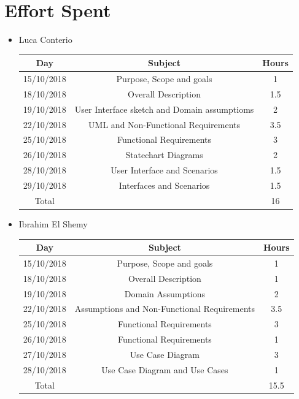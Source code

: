 \documentclass[12pt,a4paper]{article}
\begin{document}
	\section{Effort Spent}
	\begin{itemize}
		\item Luca Conterio
		\begin{center}
			\begin{tabular}{| c | c | c |}
				\hline
				Day & Subject & Hours \\ \hline
				15/10/2018 & Purpose, Scope and goals & 1 \\
				18/10/2018 & Overall Description & 1.5 \\
				19/10/2018  & User Interface sketch and Domain assumptioms & 2 \\
				22/10/2018  & UML and Non-Functional Requirements & 3.5 \\
				25/10/2018 & Functional Requirements & 3 \\
				26/10/2018 & Statechart Diagrams & 2 \\
				28/10/2018 & User Interface and Scenarios & 1.5 \\
				29/10/2018 & Interfaces and Scenarios & 1.5 \\
				\hline
				Total & & 16 \\
				\hline
			\end{tabular}
		\end{center}
		
		\item Ibrahim El Shemy
		\begin{center}
			\begin{tabular}{| c | c | c |}
				\hline
				Day & Subject & Hours \\ \hline
				15/10/2018 & Purpose, Scope and goals & 1 \\
				18/10/2018 & Overall Description & 1 \\
				19/10/2018  & Domain Assumptions & 2 \\
				22/10/2018  & Assumptions and Non-Functional Requirements & 3.5 \\
				25/10/2018 & Functional Requirements & 3 \\
				26/10/2018 & Functional Requirements & 1 \\
				27/10/2018 & Use Case Diagram & 3 \\
				28/10/2018 & Use Case Diagram and Use Cases & 1 \\
				\hline
				Total & & 15.5 \\
				\hline
			\end{tabular}
		\end{center}
	\end{itemize}
\end{document}
